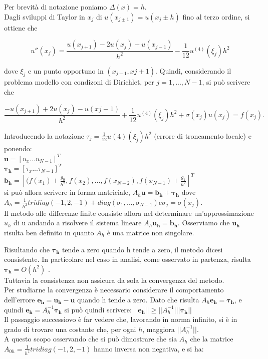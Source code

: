 Per brevità di notazione poniamo $\Delta(x)=h$.\\
Dagli sviluppi di Taylor in $x_j$ di
$u(x_{j \pm 1}) = u(x_j \pm h)$ fino al terzo ordine, si ottiene che

$$
u''(x_j) =\frac{u(x_{j+1}) - 2u(x_j) + u(x_{j-1})}{h^2} -\frac{1}{12} u^{(4)}(\xi_j)h^2
$$

dove $\xi_j$ e un punto opportuno in $(x_{j-1} , x{j+1})$. Quindi, considerando il problema modello con condizoni di Dirichlet, per $j = 1,...,N-1$, si può scrivere che

$$
\frac{-u(x_{j+1}) + 2u(x_j) -u(x{j-1})}{h^2}
 + \frac{1}{12} u^{(4)}(\xi_j)h^2 + \sigma(x_j)u(x_j) = f(x_j) .
$$

\newpage
Introducendo la notazione $\tau_{j}=\frac{1}{12} u(4)(\xi_j)h^2$ (errore di troncamento locale) e ponendo:\\

$\boldsymbol{u}=[u_x...u_{N-1}]^T$\\
$\boldsymbol{\tau_h}=[\tau_x...\tau_{N-1}]^T$\\
$\boldsymbol{b_h}=[(f(x_1) + \frac{g_0}{h^2},f(x_2),...,f(x_{N-2}),f(x_{N-1}) + \frac{g_1}{h^2}]^T$\\

si può allora scrivere in forma matriciale,
$A_h\boldsymbol{u} = \boldsymbol{b_h} + \boldsymbol{\tau_h}$
dove $A_h = \frac{1}{h^2}
 tridiag(-1,2,-1) + diag(\sigma_1, ... ,\sigma_{N-1}) e \sigma_j = \sigma(x_j)$.\\
\vspace{1em}
Il metodo alle differenze finite consiste allora nel determinare un’approssimazione $u_h$ di
u andando a risolvere il sistema lineare
$A_h\boldsymbol{u_h} = \boldsymbol{b_h}.$
Osserviamo che $\boldsymbol{u_h}$ risulta ben definito in quanto $A_h$ è una matrice non singolare.\\

\vspace{1em}

Risultando che $\boldsymbol{\tau_h}$ tende a zero quando h tende a zero, il metodo dicesi consistente. In particolare nel caso in analisi, come osservato in partenza, risulta $\boldsymbol{\tau_h} = O(h^2)$ .\\
Tuttavia la consistenza non assicura da sola la convergenza del metodo.\\
Per studiarne la convergenza è necessario considerare il comportamento dell’errore $\boldsymbol{e_h} = \boldsymbol{u_h} -\boldsymbol{u}$ quando h tende a zero. Dato che risulta $A_h\boldsymbol{e_h} = \boldsymbol{\tau_h}$, e quindi $\boldsymbol{e_h} = A_h^{-1} \boldsymbol{\tau_h}$ si può quindi scrivere: $||\boldsymbol{e_h}||\geq ||A_h^{-1}|| |\boldsymbol{\tau_h}||$\\
Il passaggio successiovo è far vedere che, lavorando in norma infinito, si è in grado di trovare una costante che, per ogni $h$, maggiora $||A_h^{-1}||$. \\ 
A questo scopo osservando che si può dimostrare che sia $A_h$ che la matrice $A_{0h} = \frac{1}{h^2} tridiag(-1,2,-1)$ hanno inversa non negativa, e si ha: 

